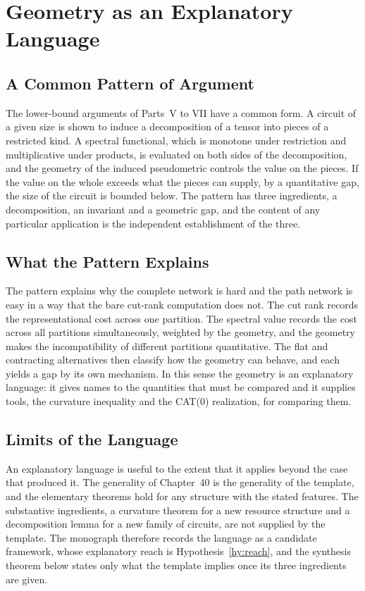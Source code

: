 \documentclass[11pt,letterpaper]{report}
\theoremstyle{plain}
\theoremstyle{definition}
\theoremstyle{remark}
\begin{document}
\chapter{Geometry as an Explanatory Language}

\section{A Common Pattern of Argument}

The lower-bound arguments of Parts~V to VII have a common form. A circuit of a given size is shown to induce a decomposition of a tensor into pieces of a restricted kind. A spectral functional, which is monotone under restriction and multiplicative under products, is evaluated on both sides of the decomposition, and the geometry of the induced pseudometric controls the value on the pieces. If the value on the whole exceeds what the pieces can supply, by a quantitative gap, the size of the circuit is bounded below. The pattern has three ingredients, a decomposition, an invariant and a geometric gap, and the content of any particular application is the independent establishment of the three.

\section{What the Pattern Explains}

The pattern explains why the complete network is hard and the path network is easy in a way that the bare cut-rank computation does not. The cut rank records the representational cost across one partition. The spectral value records the cost across all partitions simultaneously, weighted by the geometry, and the geometry makes the incompatibility of different partitions quantitative. The flat and contracting alternatives then classify how the geometry can behave, and each yields a gap by its own mechanism. In this sense the geometry is an explanatory language: it gives names to the quantities that must be compared and it supplies tools, the curvature inequality and the CAT(0) realization, for comparing them.

\section{Limits of the Language}

An explanatory language is useful to the extent that it applies beyond the case that produced it. The generality of Chapter~40 is the generality of the template, and the elementary theorems hold for any structure with the stated features. The substantive ingredients, a curvature theorem for a new resource structure and a decomposition lemma for a new family of circuits, are not supplied by the template. The monograph therefore records the language as a candidate framework, whose explanatory reach is Hypothesis~\ref{hy:reach}, and the synthesis theorem below states only what the template implies once its three ingredients are given.
\end{document}
